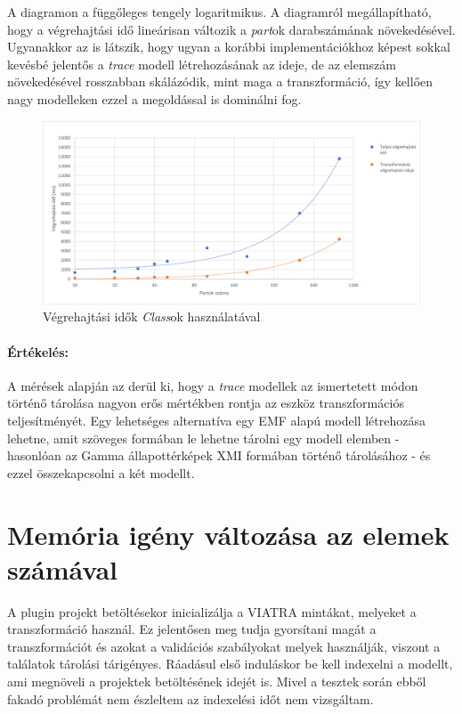 A diagramon a függőleges tengely logaritmikus. A diagramról megállapítható, hogy a végrehajtási idő lineárisan változik a \emph{part}ok darabszámának növekedésével. Ugyanakkor az is látszik, hogy ugyan a korábbi implementációkhoz képest sokkal kevésbé jelentős a \emph{trace} modell létrehozásának az ideje, de az elemszám növekedésével rosszabban skálázódik, mint maga a transzformáció, így kellően nagy modelleken ezzel a megoldással is dominálni fog.

\begin{figure}[!ht]
	\centering
	\includegraphics[width=12cm, keepaspectratio]{figures/evaluation/mes-2.png}
	\caption{Végrehajtási idők \emph{Class}ok használatával}
	\label{fig:mes-2}
\end{figure}

\paragraph{Értékelés:} A mérések alapján az derül ki, hogy a \emph{trace} modellek az ismertetett módon történő tárolása nagyon erős mértékben rontja az eszköz transzformációs teljesítményét. Egy lehetséges alternatíva egy EMF alapú modell létrehozása lehetne, amit szöveges formában le lehetne tárolni egy modell elemben - hasonlóan az Gamma állapottérképek XMI formában történő tárolásához - és ezzel összekapcsolni a két modellt.

\section{Memória igény változása az elemek számával}

A plugin projekt betöltésekor inicializálja a VIATRA mintákat, melyeket a transzformáció használ. Ez jelentősen meg tudja gyorsítani magát a transzformációt és azokat a validációs szabályokat melyek használják, viszont a találatok tárolási tárigényes. Ráadásul első induláskor be kell indexelni a modellt, ami megnöveli a projektek betöltésének idejét is. Mivel a tesztek során ebből fakadó problémát nem észleltem az indexelési időt nem vizsgáltam.

